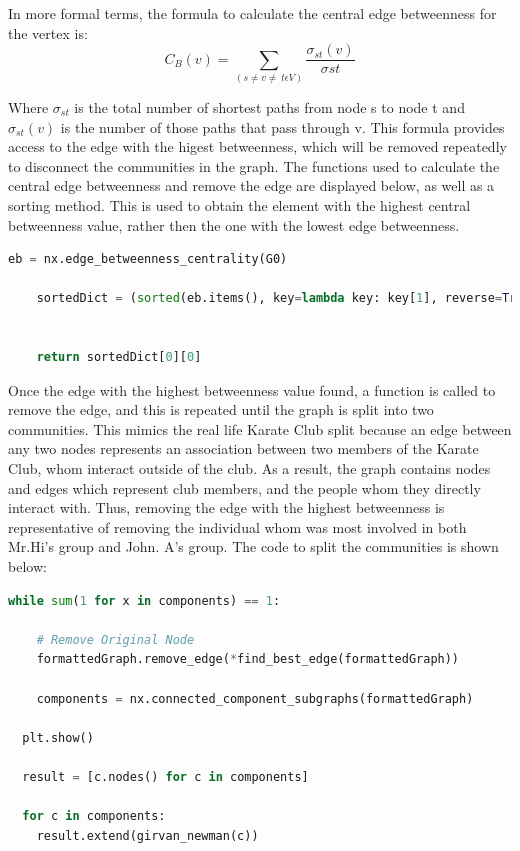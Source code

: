 \documentclass[11pt]{article} %
\begin{document}
In more formal terms, the formula to calculate the central edge betweenness for the vertex is: $$ C_ B (v) = \sum _{(s\neq v \neq \ t \epsilon V) } \frac {\sigma_{st} (v)}{\sigma{st}} $$

Where $ \sigma_{st}$ is the total number of shortest paths from node s to node t and $\sigma_{st}(v)$ is the number of those paths that pass through v. 
\newline \newline
\tabto{2.0cm} This formula provides access to the edge with the higest betweenness, which will be removed repeatedly to disconnect the communities in the graph. The functions used to calculate the central edge betweenness and remove the edge are displayed below, as well as a sorting method. This is used to obtain the element with the highest central betweenness value, rather then the one with the lowest edge betweenness.  \newline \newline
\begin{lstlisting}[language = Python, caption=Finding central edge betweenness]
 eb = nx.edge_betweenness_centrality(G0)
    
    sortedDict = (sorted(eb.items(), key=lambda key: key[1], reverse=True))

    
    return sortedDict[0][0]

\end{lstlisting} \bigskip 

\tabto{2.0cm} Once the edge with the highest betweenness value found, a function is called to remove the edge, and this is repeated until the graph is split into two communities. This mimics the real life Karate Club split because an edge between any two nodes represents an association between two members of the Karate Club, whom interact outside of the club. As a result, the graph contains nodes and edges which represent club members, and the people whom they directly interact with. Thus, removing the edge with the highest betweenness is representative of removing the individual whom was most involved in both Mr.Hi's group and John. A's group. The code to split the communities is shown below:

\begin{lstlisting}[language = Python, caption=Extracting Friend Count]
while sum(1 for x in components) == 1:
    
    # Remove Original Node
    formattedGraph.remove_edge(*find_best_edge(formattedGraph))
    
    components = nx.connected_component_subgraphs(formattedGraph)

  plt.show()

  result = [c.nodes() for c in components]
  
  for c in components: 
    result.extend(girvan_newman(c))
\end{lstlisting}
\end{document}
